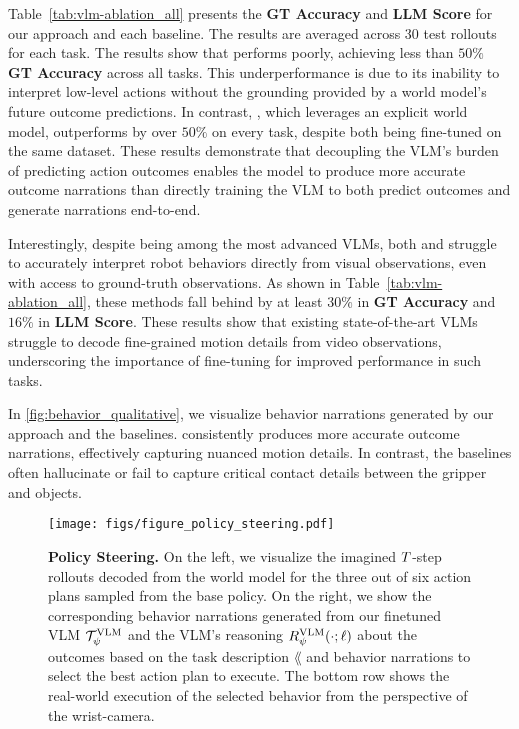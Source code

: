 

 Table~\ref{tab:vlm-ablation_all} presents the \textbf{GT Accuracy} and \textbf{LLM Score} for our approach and each baseline. The results are averaged across 30 test rollouts for each task.
The results show that \vlmact performs poorly, achieving less than $50\%$ \textbf{GT Accuracy} across all tasks. This underperformance is due to its inability to interpret low-level actions without the grounding provided by a world model’s future outcome predictions. 
In contrast, \ours, which leverages an explicit world model, outperforms \vlmact by over $50\%$ on every task, despite both being fine-tuned on the same dataset. These results demonstrate that decoupling the VLM’s burden of predicting action outcomes enables the model to produce more accurate outcome narrations than directly training the VLM to both predict outcomes and generate narrations end-to-end.



Interestingly, despite being among the most advanced VLMs, both \vlmimg and \vlmimgoracle struggle to accurately interpret robot behaviors directly from visual observations, even with access to ground-truth observations. As shown in Table~\ref{tab:vlm-ablation_all}, these methods fall behind \ours by at least $30\%$ in \textbf{GT Accuracy} and $16\%$ in \textbf{LLM Score}. These results show that existing state-of-the-art VLMs struggle to decode fine-grained motion details from video observations, underscoring the importance of fine-tuning for improved performance in such tasks.


In \autoref{fig:behavior_qualitative}, we visualize behavior narrations generated by our approach and the baselines. \ours consistently produces more accurate outcome narrations, effectively capturing nuanced motion details. In contrast, the baselines often hallucinate or fail to capture critical contact details between the gripper and objects.












 

\begin{figure*}[t!]
    \centering
    \texttt{[image: figs/figure\_policy\_steering.pdf]}
    \caption{\textbf{Policy Steering.} On the left, we visualize the imagined $T$-step rollouts decoded from the world model for the three out of six action plans sampled from the base policy. On the right, we show the corresponding behavior narrations generated from our finetuned VLM $\mathcal{T}^{\text{VLM}}_\psi$ and the VLM's reasoning $R^{\text{VLM}}_\psi(\cdot; \ell)$ about the outcomes based on the task description $\lang$ and behavior narrations to select the best action plan to execute. The bottom row shows the real-world execution of the selected behavior from the perspective of the wrist-camera.}
    \label{fig:policy-steering}
\end{figure*}



